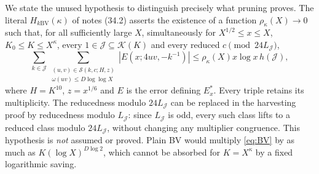 \documentclass[10pt,reqno]{amsart}
\theoremstyle{remark}
\newcommand{\K}{\mathcal K}
\newcommand{\J}{\mathcal J}
\newcommand{\Sset}{\mathcal S}
\begin{document}
We state the unused hypothesis to distinguish precisely what pruning proves.
The literal $H_{k\mathrm{BV}}(\kappa)$ of notes (34.2) asserts the existence
of a function $\rho_\kappa(X)\to0$ such that, for all sufficiently large
$X$, simultaneously for $X^{1/2}\leq x\leq X$, $K_0\leq K\leq X^\kappa$,
every $1\in\J\subseteq\K(K)$ and every reduced $c\pmod{24L_{\J}}$,
\begin{equation}\label{eq:HkBV}
 \sum_{k\in\J}\sum_{\substack{(u,v)\in\Sset(k,c;H,z)\\
                         \omega(uv)\leq D\log\log X}}
 |E(x;4uv,-k^{-1})|
 \leq\rho_\kappa(X)x\log x\,h(\J),
\end{equation}
where $H=K^{10}$, $z=x^{1/6}$ and $E$ is the error defining $E_x^*$.
Every triple retains its multiplicity.  The reducedness modulo $24L_{\J}$
can be replaced in the harvesting proof by reducedness modulo $L_{\J}$:
since $L_{\J}$ is odd, every such class lifts to a reduced class modulo
$24L_{\J}$, without changing any multiplier congruence.
This hypothesis is \emph{not}
assumed or proved.  Plain BV would multiply \eqref{eq:BV} by as much as
$K(\log X)^{D\log2}$, which cannot be absorbed for $K=X^\kappa$ by a
fixed logarithmic saving.
\end{document}
